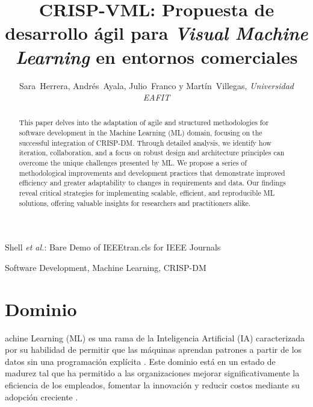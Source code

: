 \documentclass[journal]{IEEEtran}
\begin{document}

\title{CRISP-VML: Propuesta de desarrollo ágil para \textit{Visual Machine Learning} en entornos comerciales}

\author{Sara~Herrera, Andrés~Ayala, Julio~Franco y Martín~Villegas, \textit{Universidad EAFIT}}

%
{Shell \MakeLowercase{\textit{et al.}}: Bare Demo of IEEEtran.cls for IEEE Journals}

\maketitle

\begin{abstract}
This paper delves into the adaptation of agile and structured methodologies for software development in the Machine Learning (ML) domain, focusing on the successful integration of CRISP-DM. Through detailed analysis, we identify how iteration, collaboration, and a focus on robust design and architecture principles can overcome the unique challenges presented by ML. We propose a series of methodological improvements and development practices that demonstrate improved efficiency and greater adaptability to changes in requirements and data. Our findings reveal critical strategies for implementing scalable, efficient, and reproducible ML solutions, offering valuable insights for researchers and practitioners alike.
\end{abstract}

\begin{IEEEkeywords}
Software Development, Machine Learning, CRISP-DM
\end{IEEEkeywords}


\IEEEpeerreviewmaketitle


\section{Dominio}
achine Learning (ML) es una rama de la Inteligencia Artificial (IA) caracterizada por su habilidad de permitir que las máquinas aprendan patrones a partir de los datos sin una programación explícita \cite{Russell2021-eg}. Este dominio está en un estado de madurez tal que ha permitido a las organizaciones mejorar significativamente la eficiencia de los empleados, fomentar la innovación y reducir costos mediante su adopción creciente \cite{ibmWhatMachine}.\\
\end{document}
